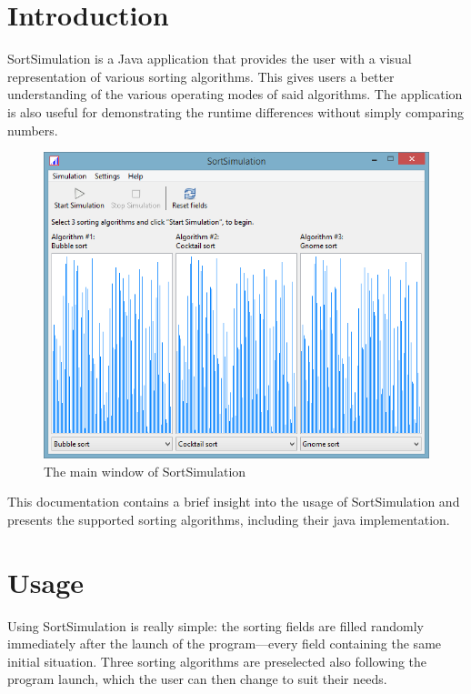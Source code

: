 \documentclass[]{pfBook}
\begin{document}
	\maketitlepage
	\cleardoublepage
	\maketableofcontents
	\cleardoublepage
	
	\section{Introduction}
	
	SortSimulation is a Java application that provides the user with a visual representation of various sorting algorithms. This gives users a better understanding of the various operating modes of said algorithms. The application is also useful for demonstrating the runtime differences without simply comparing numbers.
	
	\begin{figure}[h]
		\centering
		\includegraphics[scale=0.6]{images/image0.png}
		\caption{The main window of SortSimulation}
	\end{figure}
	
	This documentation contains a brief insight into the usage of SortSimulation and presents the supported sorting algorithms, including their java implementation.
	
	\section{Usage}
	
	Using SortSimulation is really simple: the sorting fields are filled randomly immediately after the launch of the program---every field containing the same initial situation. Three sorting algorithms are preselected also following the program launch, which the user can then change to suit their needs.
	
\end{document}
